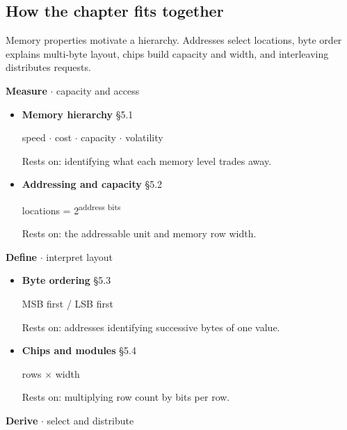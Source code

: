 \documentclass[11pt]{article}
\begin{document}
\begin{keepsection}
\section{How the chapter fits together}

Memory properties motivate a hierarchy. Addresses select locations, byte order explains multi-byte layout, chips build capacity and width, and interleaving distributes requests.

\textbf{Measure} \ensuremath{\cdot} capacity and access

\begin{itemize}
\item {}
\textbf{Memory hierarchy} \hfill{\small\color{FAUblue}§5.1}

speed \ensuremath{\cdot} cost \ensuremath{\cdot} capacity \ensuremath{\cdot} volatility

Rests on: identifying what each memory level trades away.
\item {}
\textbf{Addressing and capacity} \hfill{\small\color{FAUblue}§5.2}

locations = 2\textsuperscript{address bits}

Rests on: the addressable unit and memory row width.
\end{itemize}

\textbf{Define} \ensuremath{\cdot} interpret layout

\begin{itemize}
\item {}
\textbf{Byte ordering} \hfill{\small\color{FAUblue}§5.3}

MSB first / LSB first

Rests on: addresses identifying successive bytes of one value.
\item {}
\textbf{Chips and modules} \hfill{\small\color{FAUblue}§5.4}

rows \ensuremath{\times} width

Rests on: multiplying row count by bits per row.
\end{itemize}

\textbf{Derive} \ensuremath{\cdot} select and distribute


\end{keepsection}
\end{document}
